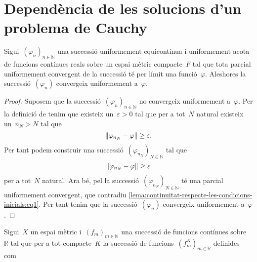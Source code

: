 \documentclass[../equacions-diferencials-I.tex]{subfiles}
\begin{document}
\section{Dependència de les solucions d'un problema de Cauchy}
    \begin{lemma}
        \label{lema:continuitat-respecte-les-condicions-inicials}
        Sigui~\((\varphi_{n})_{n\in\mathbb{N}}\) una successió uniformement equicontínua i uniformement acota de funcions contínues reals sobre un espai mètric compacte~\(F\) tal que tota parcial uniformement convergent de la successió té per límit una funció~\(\varphi\).
        Aleshores la successió~\((\varphi_{n})\) convergeix uniformement a~\(\varphi\).
    \end{lemma}
    \begin{proof}
        Suposem que la successió~\((\varphi_{n})_{n\in\mathbb{N}}\) no convergeix uniformement a~\(\varphi\).
        Per la definició de  tenim que existeix un~\(\varepsilon>0\) tal que per a tot~\(N\) natural existeix un~\(n_{N}>N\) tal que
        \[
            \norm{\varphi_{n_{N}}-\varphi}\geq\varepsilon.
        \]
        Per tant podem construir una successió~\((\varphi_{n_{N}})_{N\in\mathbb{N}}\) tal que
        \begin{equation}
            \label{lema:continuitat-respecte-les-condicions-inicials:eq1}
            \norm{\varphi_{n_{N}}-\varphi}\geq\varepsilon
        \end{equation}
        per a tot~\(N\) natural.
        Ara bé, pel  la successió~\((\varphi_{n_{N}})_{N\in\mathbb{N}}\) té una parcial uniformement convergent, que contradiu \eqref{lema:continuitat-respecte-les-condicions-inicials:eq1}.
        Per tant tenim que la successió~\((\varphi_{n})\) convergeix uniformement a~\(\varphi\).
    \end{proof}
    \begin{definition}
        \label{def:convergencia-uniforme-sobre-compactes}
        Sigui~\(X\) un espai mètric i~\((f_{m})_{m\in\mathbb{N}}\) una successió de funcions contínues sobre~\(\mathbb{R}\) tal que per a tot compacte~\(K\) la successió de funcions~\((f_{m}^{K})_{m\in\mathbb{R}}\) definides com

    \end{definition}
\end{document}

